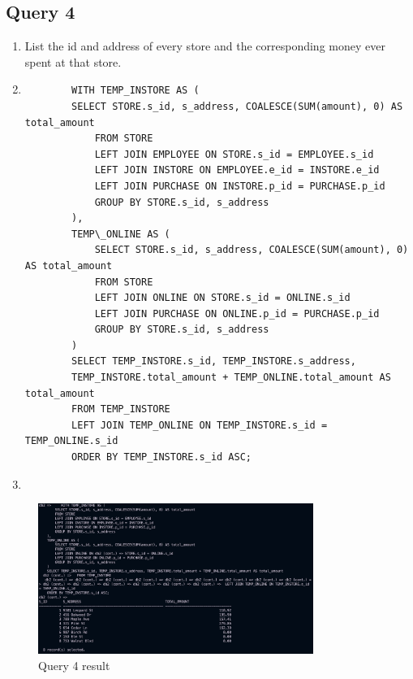 \documentclass[a4paper,11pt]{article}
\begin{document}
\subsection*{Query 4}
\begin{enumerate}[label=(\alph*)]
    \item List the id and address of every store and the corresponding money ever spent at that store.
    \item
        \begin{lstlisting}
        WITH TEMP_INSTORE AS (
        SELECT STORE.s_id, s_address, COALESCE(SUM(amount), 0) AS total_amount
            FROM STORE
            LEFT JOIN EMPLOYEE ON STORE.s_id = EMPLOYEE.s_id
            LEFT JOIN INSTORE ON EMPLOYEE.e_id = INSTORE.e_id
            LEFT JOIN PURCHASE ON INSTORE.p_id = PURCHASE.p_id
            GROUP BY STORE.s_id, s_address
        ),
        TEMP\_ONLINE AS (
            SELECT STORE.s_id, s_address, COALESCE(SUM(amount), 0) AS total_amount
            FROM STORE
            LEFT JOIN ONLINE ON STORE.s_id = ONLINE.s_id
            LEFT JOIN PURCHASE ON ONLINE.p_id = PURCHASE.p_id
            GROUP BY STORE.s_id, s_address
        )
        SELECT TEMP_INSTORE.s_id, TEMP_INSTORE.s_address,
        TEMP_INSTORE.total_amount + TEMP_ONLINE.total_amount AS total_amount
        FROM TEMP_INSTORE
        LEFT JOIN TEMP_ONLINE ON TEMP_INSTORE.s_id = TEMP_ONLINE.s_id
        ORDER BY TEMP_INSTORE.s_id ASC;
        \end{lstlisting}

    \item
\end{enumerate}
\begin{figure}[H]
    \centering
    \includegraphics[width=0.8\textwidth]{Query4.png}
    \caption{Query 4 result}
\end{figure}
\end{document}
